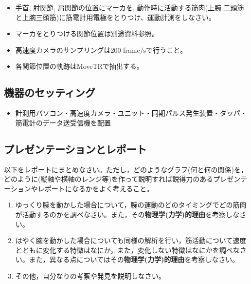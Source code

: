 \documentclass{jsarticle}
\begin{document}
\begin{itemize}
\item 手首, 肘関節, 肩関節の位置にマーカを, 動作時に活動する筋肉(上腕
  二頭筋と上腕三頭筋)に筋電計用電極をとりつけ、運動計測をしなさい。
\item マーカをとりつける関節位置は別途資料参照。
\item 高速度カメラのサンプリングは200 frame$/$sで行うこと。
\item 各関節位置の軌跡はMoveTRで抽出する。
\end{itemize}


\subsection{機器のセッティング}
\begin{itemize}
\item 計測用パソコン・高速度カメラ・ユニット・同期パルス発生装置・タッパ・筋電計のデータ送受信機を配置
\end{itemize}

\subsection{プレゼンテーションとレポート}

以下をレポートにまとめなさい。ただし，どのようなグラフ(何と何の関係)を，どのように(縦軸や横軸のレンジ等)を作って説明すれば説得力のあるプレゼンテーションやレポートになるかをよく考えること。

\begin{enumerate}
	\item ゆっくり腕を動かした場合について，腕の運動のどのタイミングでどの筋肉が活動するのかを調べなさい。また，その\textbf{物理学(力学)的理由}を考察しなさい。
	\item はやく腕を動かした場合についても同様の解析を行い，筋活動について速度とともに変化する特徴はなにか，また，変化しない特徴はなにかを調べなさい。また，異なる点についてはその\textbf{物理学(力学)的理由}を考察しなさい。
  \item その他，自分なりの考察や発見を説明しなさい。
\end{enumerate}
\end{document}

